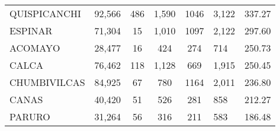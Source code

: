 \begin{tabular}{lrccclr}
	\cellcolor[HTML]{FFE699}QUISPICANCHI                           & 92,566                                                         & 486                                                         & 1,590                & 1046                     & 3,122                                                               & 337.27                                                                       \\
	\cellcolor[HTML]{FFE699}ESPINAR                                & 71,304                                                         & 15                                                          & 1,010                & 1097                     & 2,122                                                               & 297.60                                                                       \\
	\cellcolor[HTML]{FFE699}ACOMAYO                                & 28,477                                                         & 16                                                          & 424                  & 274                      & 714                                                                 & 250.73                                                                       \\
	\cellcolor[HTML]{FFE699}CALCA                                  & 76,462                                                         & 118                                                         & 1,128                & 669                      & 1,915                                                               & 250.45                                                                       \\
	\cellcolor[HTML]{FFE699}CHUMBIVILCAS                           & 84,925                                                         & 67                                                          & 780                  & 1164                     & 2,011                                                               & 236.80                                                                       \\
	\cellcolor[HTML]{C6E0B4}CANAS                                  & 40,420                                                         & 51                                                          & 526                  & 281                      & 858                                                                 & 212.27                                                                       \\
	\cellcolor[HTML]{C6E0B4}PARURO                                 & 31,264                                                         & 56                                                          & 316                  & 211                      & 583                                                                 & 186.48                                                                       \\

\end{tabular}
